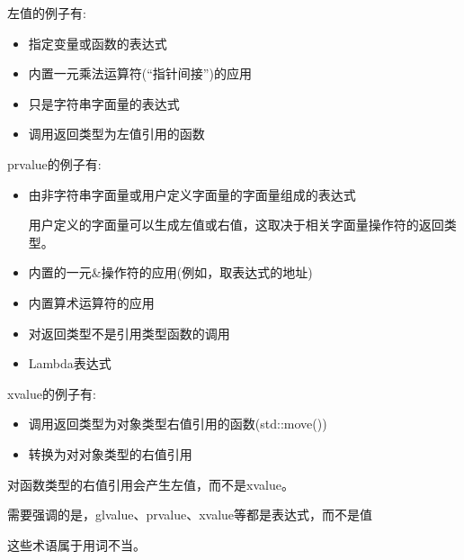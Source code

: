 左值的例子有:

\begin{itemize}
\item 
指定变量或函数的表达式

\item 
内置一元乘法运算符(“指针间接”)的应用

\item 
只是字符串字面量的表达式

\item 
调用返回类型为左值引用的函数
\end{itemize}

prvalue的例子有:

\begin{itemize}
\item 
由非字符串字面量或用户定义字面量的字面量组成的表达式

\begin{tcolorbox}[colback=webgreen!5!white,colframe=webgreen!75!black]
\hspace*{0.75cm}用户定义的字面量可以生成左值或右值，这取决于相关字面量操作符的返回类型。
\end{tcolorbox}

\item 
内置的一元\&操作符的应用(例如，取表达式的地址)

\item 
内置算术运算符的应用

\item 
对返回类型不是引用类型函数的调用

\item 
Lambda表达式
\end{itemize}

xvalue的例子有:

\begin{itemize}
\item 
调用返回类型为对象类型右值引用的函数(std::move())

\item 
转换为对对象类型的右值引用
\end{itemize}

对函数类型的右值引用会产生左值，而不是xvalue。

需要强调的是，glvalue、prvalue、xvalue等都是表达式，而不是值

\begin{tcolorbox}[colback=webgreen!5!white,colframe=webgreen!75!black]
\hspace*{0.75cm}这些术语属于用词不当。
\end{tcolorbox}

